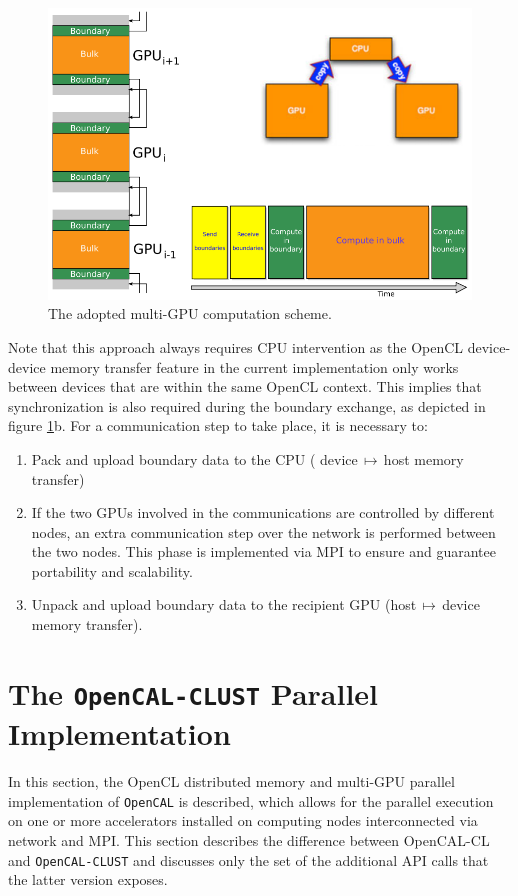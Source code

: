 \begin{figure}
    \centering
        \includegraphics[width=1.0\textwidth]{./images/opencal/multigpu_naive_exchange.png}
        \caption{The adopted multi-GPU computation scheme.}
        \label{fig:multigpu_naive_exchange}
\end{figure}


Note that this approach always requires CPU intervention as the OpenCL device-device memory transfer feature in the current implementation only works between devices that are within the same OpenCL context. This implies that synchronization is also required during the boundary exchange, as depicted in figure \ref{fig:multigpu_naive_exchange}b.
For a communication step to take place, it is necessary to:
\begin{enumerate}
    \item Pack and upload boundary data to the CPU ( device$\,\mapsto\,$host  memory transfer)
    \item If the two GPUs involved in the communications are controlled by different nodes, an extra communication step over the network is performed between the two nodes. This phase is implemented via MPI \cite{mpiStandard:1994} to ensure and guarantee portability and scalability. 
    \item Unpack and upload boundary data to the recipient GPU (host$\,\mapsto\,$device memory transfer).
\end{enumerate}


\section{The \texttt{OpenCAL-CLUST}  Parallel Implementation}
\label{sec:opencal_cluster_implementation}
  In this section, the OpenCL distributed memory and multi-GPU parallel implementation of \texttt{OpenCAL} is described, which allows for the parallel execution on one or more accelerators installed on computing nodes interconnected via network and MPI.
This section describes the difference between OpenCAL-CL and \texttt{OpenCAL-CLUST}  and discusses only the set of the additional API calls that the latter version exposes. 

